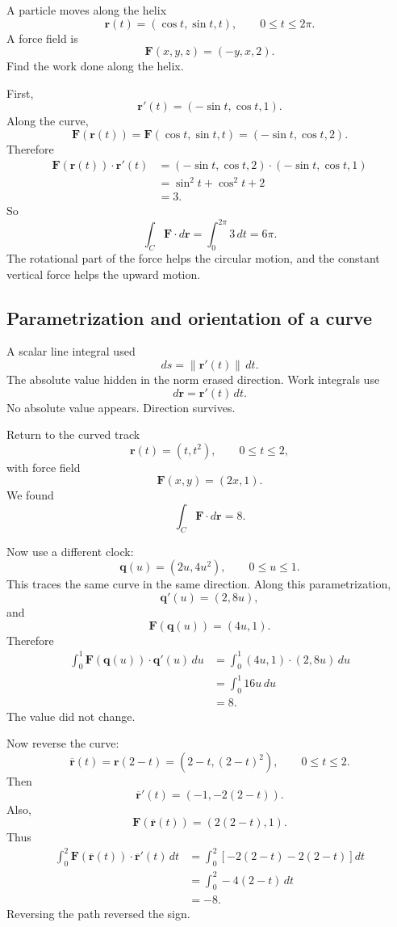 \begin{example}
A particle moves along the helix
\[
    \mathbf r(t)=(\cos t,\sin t,t),
    \qquad
    0\le t\le2\pi.
\]
A force field is
\[
    \mathbf F(x,y,z)=(-y,x,2).
\]
Find the work done along the helix.

First,
\[
    \mathbf r'(t)=(-\sin t,\cos t,1).
\]
Along the curve,
\[
    \mathbf F(\mathbf r(t))
    =
    \mathbf F(\cos t,\sin t,t)
    =
    (-\sin t,\cos t,2).
\]
Therefore
\[
\begin{aligned}
\mathbf F(\mathbf r(t))\cdot\mathbf r'(t)
&=
(-\sin t,\cos t,2)\cdot(-\sin t,\cos t,1)\\
&=
\sin^2t+\cos^2t+2\\
&=
3.
\end{aligned}
\]
So
\[
\boxed{
    \int_C \mathbf F\cdot d\mathbf r
    =
    \int_0^{2\pi}3\,dt
    =
    6\pi.
}
\]
The rotational part of the force helps the circular motion, and the constant vertical
force helps the upward motion.
\end{example}

\subsection{Parametrization and orientation of a curve}

A scalar line integral used
\[
    ds=\|\mathbf r'(t)\|\,dt.
\]
The absolute value hidden in the norm erased direction.  Work integrals use
\[
    d\mathbf r=\mathbf r'(t)\,dt.
\]
No absolute value appears.  Direction survives.

Return to the curved track
\[
    \mathbf r(t)=(t,t^2),
    \qquad
    0\le t\le2,
\]
with force field
\[
    \mathbf F(x,y)=(2x,1).
\]
We found
\[
    \int_C \mathbf F\cdot d\mathbf r=8.
\]

Now use a different clock:
\[
    \mathbf q(u)=(2u,4u^2),
    \qquad
    0\le u\le1.
\]
This traces the same curve in the same direction.  Along this parametrization,
\[
    \mathbf q'(u)=(2,8u),
\]
and
\[
    \mathbf F(\mathbf q(u))=(4u,1).
\]
Therefore
\[
\begin{aligned}
\int_0^1 \mathbf F(\mathbf q(u))\cdot\mathbf q'(u)\,du
&=
\int_0^1 (4u,1)\cdot(2,8u)\,du\\
&=
\int_0^1 16u\,du\\
&=
8.
\end{aligned}
\]
The value did not change.

Now reverse the curve:
\[
    \overline{\mathbf r}(t)=\mathbf r(2-t)
    =
    (2-t,(2-t)^2),
    \qquad
    0\le t\le2.
\]
Then
\[
    \overline{\mathbf r}'(t)=(-1,-2(2-t)).
\]
Also,
\[
    \mathbf F(\overline{\mathbf r}(t))=(2(2-t),1).
\]
Thus
\[
\begin{aligned}
\int_0^2
\mathbf F(\overline{\mathbf r}(t))\cdot \overline{\mathbf r}'(t)\,dt
&=
\int_0^2
\left[
    -2(2-t)-2(2-t)
\right]dt\\
&=
\int_0^2 -4(2-t)\,dt\\
&=
-8.
\end{aligned}
\]
Reversing the path reversed the sign.

